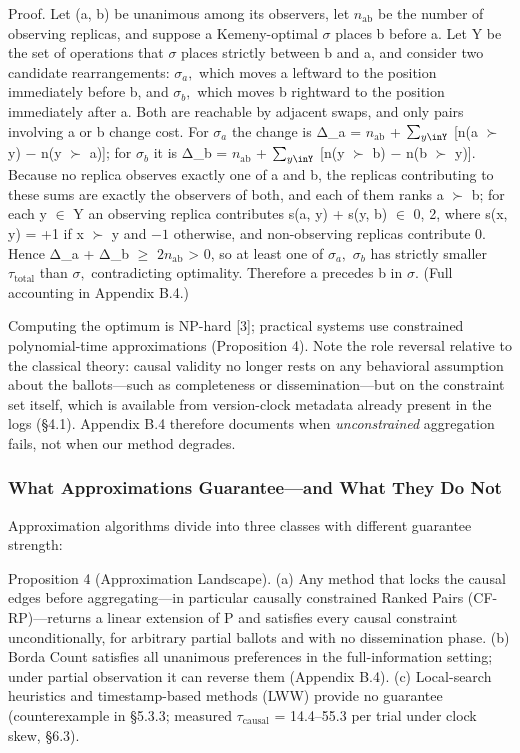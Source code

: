 \documentclass[10pt,twocolumn]{article}
\begin{document}
Proof. Let (a, b) be unanimous among its observers, let $n_{\mathrm{ab}}$ be the number of observing replicas, and suppose a Kemeny-optimal $\sigma$ places b before a. Let Y be the set of operations that $\sigma$ places strictly between b and a, and consider two candidate rearrangements: $\sigma_{a},$ which moves a leftward to the position immediately before b, and $\sigma_{b},$ which moves b rightward to the position immediately after a. Both are reachable by adjacent swaps, and only pairs involving a or b change cost. For $\sigma_{a}$ the change is Δ\_a = $n_{\mathrm{ab}}$ + $\sum_{y\inY}$ [n(a $\succ$ y) $-$ n(y $\succ$ a)]; for $\sigma_{b}$ it is Δ\_b = $n_{\mathrm{ab}}$ + $\sum_{y\inY}$ [n(y $\succ$ b) $-$ n(b $\succ$ y)]. Because no replica observes exactly one of a and b, the replicas contributing to these sums are exactly the observers of both, and each of them ranks a $\succ$ b; for each y $\in$ Y an observing replica contributes s(a, y) + s(y, b) $\in$ {0, 2}, where s(x, y) = +1 if x $\succ$ y and $-1$ otherwise, and non-observing replicas contribute 0. Hence Δ\_a + Δ\_b $\geq$ $2n_{\mathrm{ab}}$ > 0, so at least one of $\sigma_{a},$ $\sigma_{b}$ has strictly smaller $\tau_{\mathrm{total}}$ than $\sigma,$ contradicting optimality. Therefore a precedes b in $\sigma.$ (Full accounting in Appendix B.4.)

Computing the optimum is NP-hard [3]; practical systems use constrained polynomial-time approximations (Proposition 4). Note the role reversal relative to the classical theory: causal validity no longer rests on any behavioral assumption about the ballots—such as completeness or dissemination—but on the constraint set itself, which is available from version-clock metadata already present in the logs (§4.1). Appendix B.4 therefore documents when \emph{unconstrained} aggregation fails, not when our method degrades.

\subsubsection{What Approximations Guarantee—and What They Do Not}
Approximation algorithms divide into three classes with different guarantee strength:

Proposition 4 (Approximation Landscape). (a) Any method that locks the causal edges before aggregating—in particular causally constrained Ranked Pairs (CF-RP)—returns a linear extension of P and satisfies every causal constraint unconditionally, for arbitrary partial ballots and with no dissemination phase. (b) Borda Count satisfies all unanimous preferences in the full-information setting; under partial observation it can reverse them (Appendix B.4). (c) Local-search heuristics and timestamp-based methods (LWW) provide no guarantee (counterexample in §5.3.3; measured $\tau_{\mathrm{causal}}$ = 14.4–55.3 per trial under clock skew, §6.3).
\end{document}
